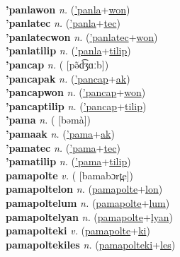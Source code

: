  \label{'panlaak} \\
\textbf{'panlawon} \textit{n.} (\hyperref['panla]{'panla}+\hyperref[won]{won})
 \label{'panlawon} \\
\textbf{'panlatec} \textit{n.} (\hyperref['panla]{'panla}+\hyperref[tec]{tec})
 \label{'panlatec} \\
\textbf{'panlatecwon} \textit{n.} (\hyperref['panlatec]{'panlatec}+\hyperref[won]{won})
 \label{'panlatecwon} \\
\textbf{'panlatilip} \textit{n.} (\hyperref['panla]{'panla}+\hyperref[tilip]{tilip})
 \label{'panlatilip} \\
\textbf{'pancap} \textit{n.} ( [pə̃d͡ʒɑːb])
 \label{'pancap} \\
\textbf{'pancapak} \textit{n.} (\hyperref['pancap]{'pancap}+\hyperref[ak]{ak})
 \label{'pancapak} \\
\textbf{'pancapwon} \textit{n.} (\hyperref['pancap]{'pancap}+\hyperref[won]{won})
 \label{'pancapwon} \\
\textbf{'pancaptilip} \textit{n.} (\hyperref['pancap]{'pancap}+\hyperref[tilip]{tilip})
 \label{'pancaptilip} \\
\textbf{'pama} \textit{n.} ( [bəmà])
 \label{'pama} \\
\textbf{'pamaak} \textit{n.} (\hyperref['pama]{'pama}+\hyperref[ak]{ak})
 \label{'pamaak} \\
\textbf{'pamatec} \textit{n.} (\hyperref['pama]{'pama}+\hyperref[tec]{tec})
 \label{'pamatec} \\
\textbf{'pamatilip} \textit{n.} (\hyperref['pama]{'pama}+\hyperref[tilip]{tilip})
 \label{'pamatilip} \\
\textbf{pamapolte} \textit{v.} ( [bamabɔrt̪e])
 \label{pamapolte} \\
\textbf{pamapoltelon} \textit{n.} (\hyperref[pamapolte]{pamapolte}+\hyperref[lon]{lon})
 \label{pamapoltelon} \\
\textbf{pamapoltelum} \textit{n.} (\hyperref[pamapolte]{pamapolte}+\hyperref[lum]{lum})
 \label{pamapoltelum} \\
\textbf{pamapoltelyan} \textit{n.} (\hyperref[pamapolte]{pamapolte}+\hyperref[lyan]{lyan})
 \label{pamapoltelyan} \\
\textbf{pamapolteki} \textit{v.} (\hyperref[pamapolte]{pamapolte}+\hyperref[ki]{ki})
 \label{pamapolteki} \\
\textbf{pamapoltekiles} \textit{n.} (\hyperref[pamapolteki]{pamapolteki}+\hyperref[les]{les})
 \label{pamapoltekiles} \\
